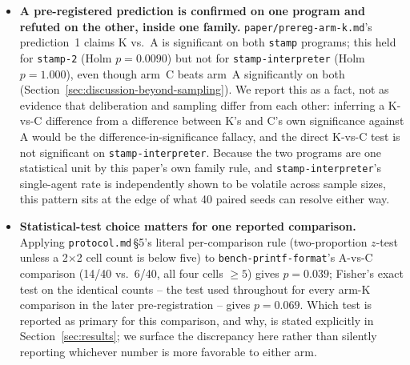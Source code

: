 \begin{itemize}
\item \textbf{A pre-registered prediction is confirmed on one program and refuted on the other, inside
  one family.} \texttt{paper/prereg-arm-k.md}'s prediction~1 claims K vs.\ A is significant on both
  \texttt{stamp} programs; this held for \texttt{stamp-2} (Holm $p=0.0090$) but not for
  \texttt{stamp-interpreter} (Holm $p=1.000$), even though arm~C beats arm~A significantly on both
  (Section~\ref{sec:discussion-beyond-sampling}). We report this as a fact, not as evidence that
  deliberation and sampling differ from each other: inferring a K-vs-C difference from a difference
  between K's and C's own significance against A would be the difference-in-significance fallacy, and
  the direct K-vs-C test is not significant on \texttt{stamp-interpreter}. Because the two programs are
  one statistical unit by this paper's own family rule, and \texttt{stamp-interpreter}'s single-agent
  rate is independently shown to be volatile across sample sizes, this pattern sits at the edge of what
  40 paired seeds can resolve either way.

\item \textbf{Statistical-test choice matters for one reported comparison.} Applying
  \texttt{protocol.md}\,\S5's literal per-comparison rule (two-proportion $z$-test unless a 2$\times$2
  cell count is below five) to \texttt{bench-printf-format}'s A-vs-C comparison (14/40 vs.\ 6/40, all
  four cells $\geq 5$) gives $p=0.039$; Fisher's exact test on the identical counts -- the test used
  throughout for every arm-K comparison in the later pre-registration -- gives $p=0.069$. Which test is
  reported as primary for this comparison, and why, is stated explicitly in Section~\ref{sec:results};
  we surface the discrepancy here rather than silently reporting whichever number is more favorable to
  either arm.

\end{itemize}
